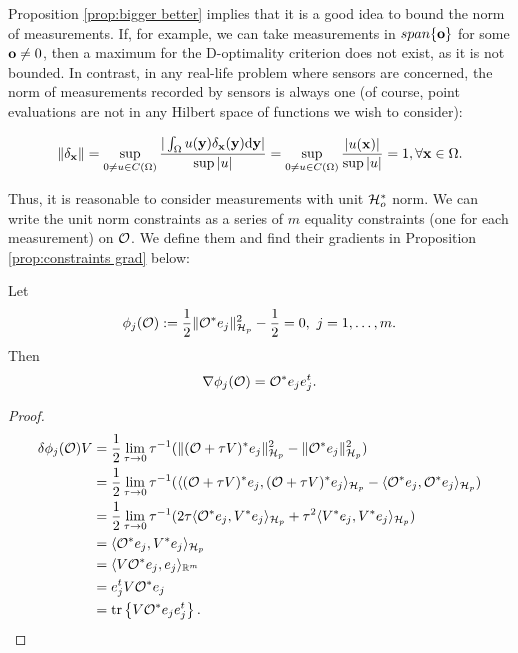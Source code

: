 Proposition \ref{prop:bigger better} implies that it is a good idea to
bound the norm of measurements. If, for example, we can take
measurements in $span\{\mathbf{o}\}$ for some $\mathbf{o} \neq 0$, then a
maximum for the D-optimality criterion does not exist, as it is not
bounded. In contrast, in any real-life problem where sensors are
concerned, the norm of measurements recorded by sensors is always one
(of course, point evaluations are not in any Hilbert space of
functions we wish to consider):

\begin{equation}
  \| \delta_{\x} \| = \sup_{0 \neq u \in C(\Omega)}
  \frac{
    |\int_{\Omega}u(\y) \delta_{\x}(\y) \der \y|
  }{
    \sup|u|
  } = \sup_{0 \neq u \in C(\Omega)} \frac{|u(\x)|}{\sup|u|} = 1,
  \forall \x \in \Omega.
\end{equation}

Thus, it is reasonable to consider measurements with unit $\mathcal{H}_o^*$
norm. We can write the unit norm constraints as a series of $m$
equality constraints (one for each measurement) on $\mathcal{O}$. We define
them and find their gradients in Proposition \ref{prop:constraints
  grad} below:

\begin{proposition}\label{prop:constraints grad}
  Let
  \begin{align*}
    \phi_j(\obs) :=\frac12 \| \obs^* e_j\|_{\hilp}^2 - \frac12 = 0,\ j=1,\dots,m.
  \end{align*}
  Then
  \begin{equation*}
    \nabla \phi_j(\obs) = \obs^* e_je_j^t.
  \end{equation*}
\end{proposition}

\begin{proof}
  \begin{align*}
    \delta \phi_j(\obs)V  
    &= \frac12\lim_{\tau \to 0}\tau^{-1}
    ( \|(\obs + \tau V)^*e_j \|_{\hilp}^2 - \|\obs ^*e_j \|_{\hilp}^2  ) \\
    &= \frac12\lim_{\tau \to 0}\tau^{-1}
    ( \langle (\obs + \tau V)^*e_j, (\obs + \tau V)^*e_j \rangle_{\hilp} - 
    \langle \obs^*e_j, \obs^*e_j \rangle_{\hilp} ) \\
    &= \frac12\lim_{\tau \to 0}\tau^{-1}
    (2\tau \langle \obs^*e_j,V^*e_j \rangle_{\hilp} 
    +\tau^2 \langle V^*e_j, V^*e_j \rangle_{\hilp} ) \\
    &= \langle \obs^*e_j,V^*e_j \rangle_{\hilp} \\
    &= \langle V \obs^*e_j,e_j \rangle_{\R^m} \\
    &= e_j^t V \obs^* e_j \\
    &= \tr{V \obs^* e_je_j^t}.
  \end{align*}
\end{proof}



